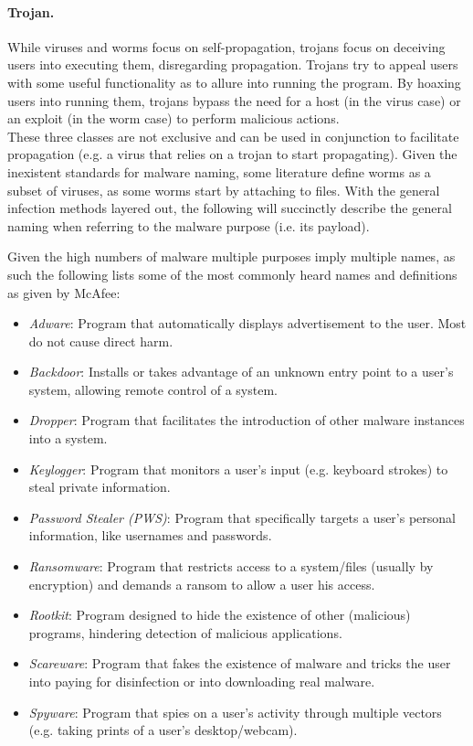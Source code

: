 \paragraph{Trojan.} While viruses and worms focus on self-propagation, trojans focus on deceiving users into executing them, disregarding propagation. Trojans try to appeal users with some useful functionality as to allure into running the program\cite{szor:art}. By hoaxing users into running them, trojans bypass the need for a host (in the virus case) or an exploit (in the worm case) to perform malicious actions.\\

These three classes are not exclusive and can be used in conjunction to facilitate propagation (e.g. a virus that relies on a trojan to start propagating). Given the inexistent standards for malware naming, some literature\cite{szor:art} define worms as a subset of viruses, as some worms start by attaching to files. With the general infection methods layered out, the following will succinctly describe the general naming when referring to the malware purpose (i.e. its payload).

Given the high numbers of malware multiple purposes imply multiple names, as such the following lists some of the most commonly heard names and definitions as given by McAfee\cite{mcafee:glossary}:

\begin{itemize}
	\item \textit{Adware}: Program that automatically displays advertisement to the user. Most do not cause direct harm.
	\item \textit{Backdoor}: Installs or takes advantage of an unknown entry point to a user's system, allowing remote control of a system.
	\item \textit{Dropper}: Program that facilitates the introduction of other malware instances into a system.
	\item \textit{Keylogger}: Program that monitors a user's input (e.g. keyboard strokes) to steal private information.
	\item \textit{Password Stealer (PWS)}: Program that specifically targets a user's personal information, like usernames and passwords.
	\item \textit{Ransomware}: Program that restricts access to a system/files (usually by encryption) and demands a ransom to allow a user his access.
	\item \textit{Rootkit}: Program designed to hide the existence of other (malicious) programs, hindering detection of malicious applications.
	\item \textit{Scareware}: Program that fakes the existence of malware and tricks the user into paying for disinfection or into downloading real malware.
	\item \textit{Spyware}: Program that spies on a user's activity through multiple vectors (e.g. taking prints of a user's desktop/webcam).
\end{itemize}

